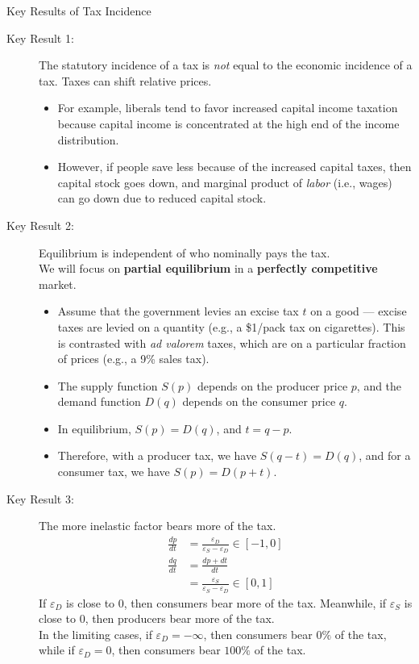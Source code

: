 \documentclass[10pt]{extarticle}
\begin{document}
  \begin{problem}{Key Results of Tax Incidence}
    \begin{description}
      \item[Key Result 1:] The statutory incidence of a tax is \textit{not} equal to the economic incidence of a tax. Taxes can shift relative prices.
        \begin{itemize}
          \item For example, liberals tend to favor increased capital income taxation because capital income is concentrated at the high end of the income distribution.
          \item However, if people save less because of the increased capital taxes, then capital stock goes down, and marginal product of \textit{labor} (i.e., wages) can go down due to reduced capital stock.
        \end{itemize}
      \item[Key Result 2:] Equilibrium is independent of who nominally pays the tax.\\

        We will focus on \textbf{partial equilibrium} in a \textbf{perfectly competitive} market.
        \begin{itemize}
          \item Assume that the government levies an excise tax $t$ on a good --- excise taxes are levied on a quantity (e.g., a \$1/pack tax on cigarettes). This is contrasted with \textit{ad valorem} taxes, which are on a particular fraction of prices (e.g., a 9\% sales tax).
          \item The supply function $S(p)$ depends on the producer price $p$, and the demand function $D(q)$ depends on the consumer price $q$.
          \item In equilibrium, $S(p) = D(q)$, and $t = q-p$.
          \item Therefore, with a producer tax, we have $S(q-t) = D(q)$, and for a consumer tax, we have $S(p) = D(p+t)$.
        \end{itemize}
      \item[Key Result 3:] The more inelastic factor bears more of the tax.
        \begin{align*}
          \frac{dp}{dt} &= \frac{\varepsilon_D}{\varepsilon_S - \varepsilon_D} \in [-1,0]\\
          \frac{dq}{dt} &= \frac{dp + dt}{dt}\\
                        &= \frac{\varepsilon_S}{\varepsilon_S - \varepsilon_D} \in [0,1]
        \end{align*}
        If $\varepsilon_D$ is close to $0$, then consumers bear more of the tax. Meanwhile, if $\varepsilon_S$ is close to $0$, then producers bear more of the tax.\\

        In the limiting cases, if $\varepsilon_D = -\infty$, then consumers bear $0\%$ of the tax, while if $\varepsilon_D = 0$, then consumers bear $100\%$ of the tax.
    \end{description}
  \end{problem}
\end{document}
